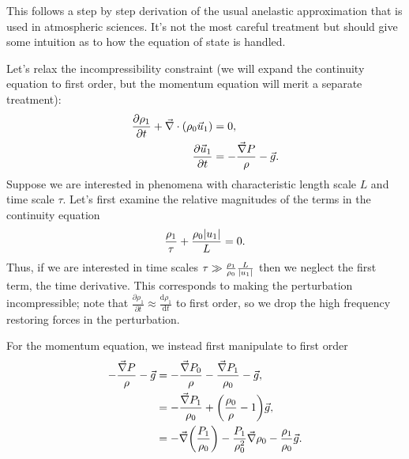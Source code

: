 \documentclass[11pt,
        usenames, %
        dvipsnames %
    ]{report}
\newcommand*{\rd}[2]{\frac{\mathrm{d}#1}{\mathrm{d}#2}}
\newcommand*{\pd}[2]{\frac{\partial#1}{\partial#2}}
\DeclarePairedDelimiter\abs{\lvert}{\rvert}
\DeclarePairedDelimiter\p{\lparen}{\rparen}
\begin{document}
This follows a step by step derivation of the usual anelastic approximation that
is used in atmospheric sciences. It's not the most careful treatment but should
give some intuition as to how the equation of state is handled.

Let's relax the incompressibility constraint (we will expand the continuity
equation to first order, but the momentum equation will merit a separate
treatment):
\begin{equation}
    \begin{split}
        \pd{\rho_1}{t} + \vec{\nabla} \cdot \p*{\rho_0 \vec{u}_1} &= 0,\\
        \pd{\vec{u}_1}{t} &= -\frac{\vec{\nabla}P}{\rho} - \vec{g}.
    \end{split}
\end{equation}
Suppose we are interested in phenomena with characteristic length scale $L$ and
time scale $\tau$. Let's first examine the relative magnitudes of the terms in
the continuity equation
\begin{equation*}
    \frac{\rho_1}{\tau} + \frac{\rho_0 \abs{u_1}}{L} = 0.
\end{equation*}
Thus, if we are interested in time scales $\tau \gg
\frac{\rho_1}{\rho_0}\frac{L}{\abs{u_1}}$ then we neglect the first term, the
time derivative. This corresponds to making the perturbation incompressible;
note that $\pd{\rho_1}{t} \approx \rd{\rho_1}{t}$ to first order, so we drop the
high frequency restoring forces in the perturbation.

For the momentum equation, we instead first manipulate to first order
\begin{align}
    -\frac{\vec{\nabla}P}{\rho} - \vec{g}
        &= -\frac{\vec{\nabla}P_0}{\rho} - \frac{\vec{\nabla}P_1}{\rho_0}
            - \vec{g},\nonumber\\
        &= - \frac{\vec{\nabla}P_1}{\rho_0} +
            \p*{\frac{\rho_0}{\rho} - 1}\vec{g},\nonumber\\
        &= -\vec{\nabla}\p*{\frac{P_1}{\rho_0}}
            - \frac{P_1}{\rho_0^2}\vec{\nabla}\rho_0
            - \frac{\rho_1}{\rho_0}\vec{g}.
\end{align}
\end{document}
